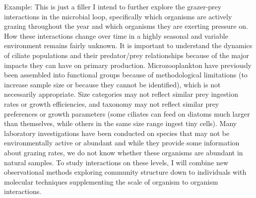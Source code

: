 % 
% 
%

Example: This is just a filler
I intend to further explore the grazer-prey interactions in the microbial loop, specifically which organisms are actively grazing throughout the year and which organisms they are exerting pressure on.  How these interactions change over time in a highly seasonal and variable environment remains fairly unknown. It is important to understand the dynamics of ciliate populations and their predator/prey relationships because of the major impacts they can have on primary production.  Microzooplankton have previously been assembled into functional groups because of methodological limitations (to increase sample size or because they cannot be identified), which is not necessarily appropriate. Size categories may not reflect similar prey ingestion rates or growth efficiencies, and taxonomy may not reflect similar prey preferences or growth parameters (some ciliates can feed on diatoms much larger than themselves, while others in the same size range ingest tiny cells). Many laboratory investigations have been conducted on species that may not be environmentally active or abundant and while they provide some information about grazing rates, we do not know whether these organisms are abundant in natural samples. To study interactions on these levels, I will combine new observational methods exploring community structure down to individuals with molecular techniques supplementing the scale of organism to organism interactions.  
